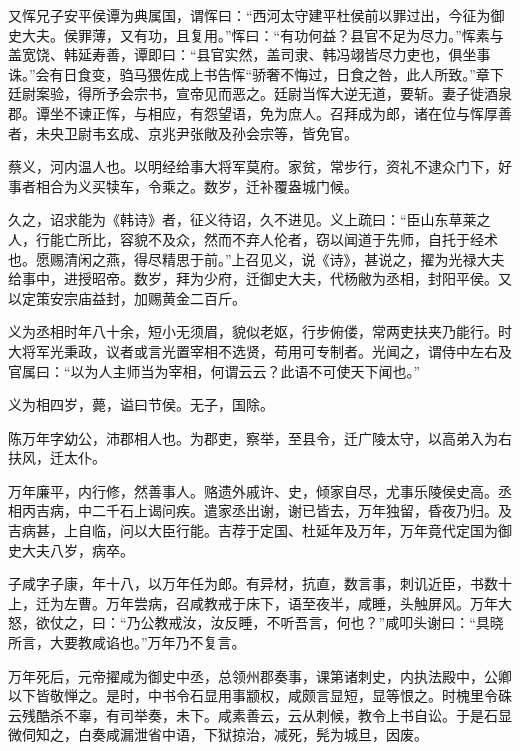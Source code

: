 \documentclass[12pt,UTF8]{ctexbook}
\begin{document}
又恽兄子安平侯谭为典属国，谓恽曰：“西河太守建平杜侯前以罪过出，今征为御史大夫。侯罪薄，又有功，且复用。”恽曰：“有功何益？县官不足为尽力。”恽素与盖宽饶、韩延寿善，谭即曰：“县官实然，盖司隶、韩冯翊皆尽力吏也，俱坐事诛。”会有日食变，驺马猥佐成上书告恽“骄奢不悔过，日食之咎，此人所致。”章下廷尉案验，得所予会宗书，宣帝见而恶之。廷尉当恽大逆无道，要斩。妻子徙酒泉郡。谭坐不谏正恽，与相应，有怨望语，免为庶人。召拜成为郎，诸在位与恽厚善者，未央卫尉韦玄成、京兆尹张敞及孙会宗等，皆免官。



蔡义，河内温人也。以明经给事大将军莫府。家贫，常步行，资礼不逮众门下，好事者相合为义买犊车，令乘之。数岁，迁补覆盎城门候。



久之，诏求能为《韩诗》者，征义待诏，久不进见。义上疏曰：“臣山东草莱之人，行能亡所比，容貌不及众，然而不弃人伦者，窃以闻道于先师，自托于经术也。愿赐清闲之燕，得尽精思于前。”上召见义，说《诗》，甚说之，擢为光禄大夫给事中，进授昭帝。数岁，拜为少府，迁御史大夫，代杨敝为丞相，封阳平侯。又以定策安宗庙益封，加赐黄金二百斤。



义为丞相时年八十余，短小无须眉，貌似老妪，行步俯偻，常两吏扶夹乃能行。时大将军光秉政，议者或言光置宰相不选贤，苟用可专制者。光闻之，谓侍中左右及官属曰：“以为人主师当为宰相，何谓云云？此语不可使天下闻也。”



义为相四岁，薨，谥曰节侯。无子，国除。



陈万年字幼公，沛郡相人也。为郡吏，察举，至县令，迁广陵太守，以高弟入为右扶风，迁太仆。



万年廉平，内行修，然善事人。赂遗外戚许、史，倾家自尽，尤事乐陵侯史高。丞相丙吉病，中二千石上谒问疾。遣家丞出谢，谢已皆去，万年独留，昏夜乃归。及吉病甚，上自临，问以大臣行能。吉荐于定国、杜延年及万年，万年竟代定国为御史大夫八岁，病卒。



子咸字子康，年十八，以万年任为郎。有异材，抗直，数言事，刺讥近臣，书数十上，迁为左曹。万年尝病，召咸教戒于床下，语至夜半，咸睡，头触屏风。万年大怒，欲仗之，曰：“乃公教戒汝，汝反睡，不听吾言，何也？”咸叩头谢曰：“具晓所言，大要教咸谄也。”万年乃不复言。



万年死后，元帝擢咸为御史中丞，总领州郡奏事，课第诸刺史，内执法殿中，公卿以下皆敬惮之。是时，中书令石显用事颛权，咸颇言显短，显等恨之。时槐里令硃云残酷杀不辜，有司举奏，未下。咸素善云，云从刺候，教令上书自讼。于是石显微伺知之，白奏咸漏泄省中语，下狱掠治，减死，髡为城旦，因废。
\end{document}
